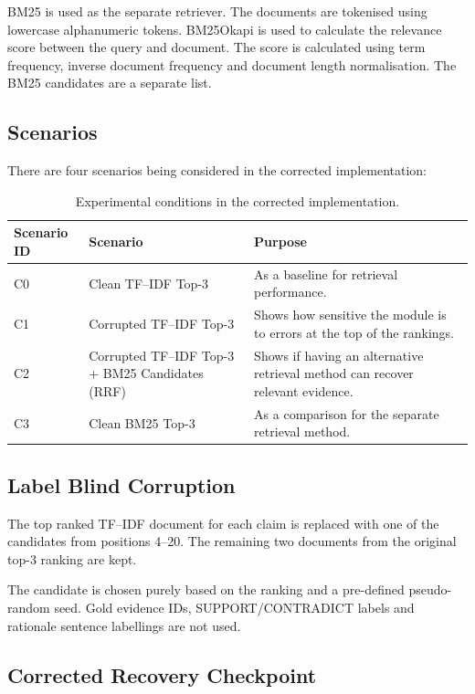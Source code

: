 \documentclass[11pt,a4paper]{article}
\begin{document}
BM25 is used as the separate retriever. The documents are tokenised using lowercase alphanumeric tokens. BM25Okapi is used to calculate the relevance score between the query and document. The score is calculated using term frequency, inverse document frequency and document length normalisation. The BM25 candidates are a separate list.

\subsection{Scenarios}

There are four scenarios being considered in the corrected implementation:

\begin{table}[H]
\centering
\caption{Experimental conditions in the corrected implementation.}
\label{tab:conditions}
\begin{tabularx}{\linewidth}{l X X}
\toprule
\textbf{Scenario ID} & \textbf{Scenario} & \textbf{Purpose} \\
\midrule
C0 & Clean TF--IDF Top-3 & As a baseline for retrieval performance. \\
C1 & Corrupted TF--IDF Top-3 & Shows how sensitive the module is to errors at the top of the rankings. \\
C2 & Corrupted TF--IDF Top-3 + BM25 Candidates (RRF) & Shows if having an alternative retrieval method can recover relevant evidence. \\
C3 & Clean BM25 Top-3 & As a comparison for the separate retrieval method. \\
\bottomrule
\end{tabularx}
\end{table}

\subsection{Label Blind Corruption}

The top ranked TF--IDF document for each claim is replaced with one of the candidates from positions 4--20. The remaining two documents from the original top-3 ranking are kept.

The candidate is chosen purely based on the ranking and a pre-defined pseudo-random seed. Gold evidence IDs, SUPPORT/CONTRADICT labels and rationale sentence labellings are not used.

\subsection{Corrected Recovery Checkpoint}
\end{document}

